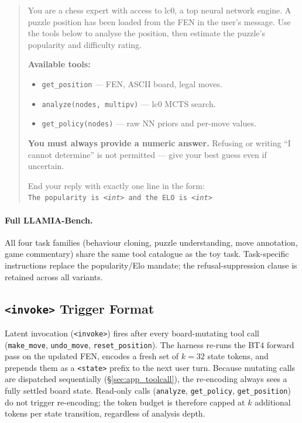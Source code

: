 \begin{tcolorbox}[promptbox,
  title={$\triangleright$\; Stage~2 System Prompt --- Puzzle Understanding}]
\begin{quote}
You are a chess expert with access to lc0, a top neural network engine.
A puzzle position has been loaded from the FEN in the user's message.
Use the tools below to analyse the position, then estimate the puzzle's popularity and
difficulty rating.

\smallskip
\textbf{Available tools:}
\begin{itemize}[noitemsep,topsep=1pt,leftmargin=14pt]
  \item \texttt{get\_position} --- FEN, ASCII board, legal moves.
  \item \texttt{analyze(nodes, multipv)} --- lc0 MCTS search.
  \item \texttt{get\_policy(nodes)} --- raw NN priors and per-move values.
\end{itemize}

\smallskip
\textbf{You must always provide a numeric answer.}
Refusing or writing ``I cannot determine'' is not permitted ---
give your best guess even if uncertain.

\smallskip
End your reply with exactly one line in the form:\\[2pt]
\texttt{The popularity is \textit{<int>} and the ELO is \textit{<int>}}
\end{quote}
\end{tcolorbox}

\paragraph{Full LLAMIA-Bench.}
All four task families (behaviour cloning, puzzle understanding, move
annotation, game commentary) share the same tool catalogue as the toy task.
Task-specific instructions replace the popularity/Elo mandate; the
refusal-suppression clause is retained across all variants.

\subsection{\texttt{<invoke>} Trigger Format}
\label{sec:app_prompts_invoke}

Latent invocation (\texttt{<invoke>}) fires after every board-mutating tool call
(\texttt{make\_move}, \texttt{undo\_move}, \texttt{reset\_position}).
The harness re-runs the BT4 forward pass on the updated FEN, encodes a fresh set of
$k{=}32$ state tokens, and prepends them as a \texttt{<state>} prefix to the next user
turn.
Because mutating calls are dispatched sequentially (\S\ref{sec:app_toolcall}), the
re-encoding always sees a fully settled board state.
Read-only calls (\texttt{analyze}, \texttt{get\_policy}, \texttt{get\_position}) do not
trigger re-encoding; the token budget is therefore capped at $k$ additional tokens per
state transition, regardless of analysis depth.

